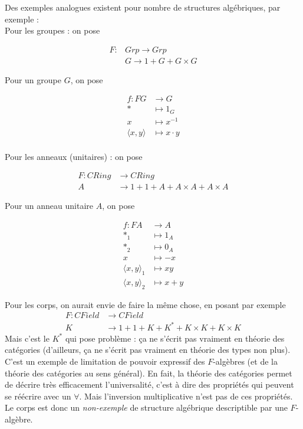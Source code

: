 \documentclass{article}
\begin{document}
Des exemples analogues existent pour nombre de structures algébriques, par exemple : 
\\
Pour les groupes : on pose

\begin{align*}
    F :&  Grp  \rightarrow Grp\\
      & G  \rightarrow 1 + G + G \times G
\end{align*}

Pour un groupe $G$, on pose 

\begin{align*}
    f : F G & \rightarrow G \\
     * & \mapsto 1_G \\ 
     x & \mapsto x^{-1} \\ 
      \langle x,y \rangle & \mapsto x \cdot y
\end{align*}
\\

Pour les anneaux (unitaires) : on pose

\begin{align*}
    F : CRing & \rightarrow CRing \\
      A & \rightarrow 1 + 1 + A + A \times A + A \times A
\end{align*}

Pour un anneau unitaire $A$, on pose 

\begin{align*}
    f : F A & \rightarrow A \\
     *_1 & \mapsto 1_A \\
     *_2 & \mapsto 0_A \\ 
     x & \mapsto -x \\ 
      \langle x,y \rangle_1 & \mapsto xy \\ 
    \langle x,y \rangle_2 & \mapsto x+y
\end{align*}

Pour les corps, on aurait envie de faire la même chose, en posant par exemple 
\begin{align*}
    F : CField &  \rightarrow CField \\
      K & \rightarrow 1 + 1 + K + K^* + K \times K + K \times K
\end{align*}
Mais c'est le $K^*$ qui pose problème : ça ne s'écrit pas vraiment en théorie des catégories (d'ailleurs, ça ne s'écrit pas vraiment en théorie des types non plus). C'est un exemple de limitation de pouvoir expressif des $F$-algèbres (et de la théorie des catégories au sens général). En fait, la théorie des catégories permet de décrire très efficacement l'universalité, c'est à dire des propriétés qui peuvent se réécrire avec un $\forall$. Mais l'inversion multiplicative n'est pas de ces propriétés. Le corps est donc un \textit{non-exemple} de structure algébrique descriptible par une $F$-algèbre. 
\end{document}
